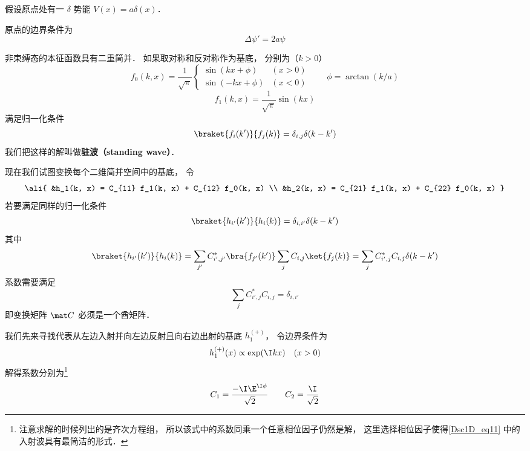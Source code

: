 
假设原点处有一 $\delta$ 势能 $V(x) = a\delta(x)$．

原点的边界条件为
\begin{equation}
\Delta \psi' = 2a \psi
\end{equation}

非束缚态的本征函数具有二重简并． 如果取对称和反对称作为基底， 分别为（$k > 0$）
\begin{equation}
f_0(k, x) = \frac{1}{\sqrt{\pi}}
\begin{cases}
\sin(kx + \phi) & (x > 0)\\
\sin(-kx + \phi) & (x < 0)
\end{cases}
\qquad  \phi = \arctan(k/a)
\end{equation}
\begin{equation}
f_1(k, x) = \frac{1}{\sqrt{\pi}}\sin(kx)
\end{equation}
满足归一化条件
\begin{equation}\label{Dsc1D_eq4}
\braket{f_i(k')}{f_j(k)} = \delta_{i,j} \delta(k - k')
\end{equation}
我们把这样的解叫做\textbf{驻波（standing wave）}．

现在我们试图变换每个二维简并空间中的基底， 令
\begin{equation}\ali{
&h_1(k, x) =  C_{11} f_1(k, x) + C_{12} f_0(k, x) \\
&h_2(k, x) =  C_{21} f_1(k, x) + C_{22} f_0(k, x)
}\end{equation}
若要满足同样的归一化条件
\begin{equation}\label{Dsc1D_eq6}
\braket{h_{i'}(k')}{h_i(k)} = \delta_{i,i'}\delta(k - k')
\end{equation}
其中
\begin{equation}
\braket{h_{i'}(k')}{h_i(k)} = \sum_{j'} C_{i',j'}^* \bra{f_{j'}(k')} \sum_j C_{i, j} \ket{f_j(k)} = \sum_j C_{i', j}^* C_{i, j} \delta(k - k')
\end{equation}
系数需要满足
\begin{equation}
 \sum_j C_{i', j}^* C_{i, j} = \delta_{i, i'}
\end{equation}
即变换矩阵 $\mat C$ 必须是一个酋矩阵．

我们先来寻找代表从左边入射并向左边反射且向右边出射的基底 $h_1^{(+)}$， 令边界条件为
\begin{equation}
h_1^{(+)}(x) \propto \exp(\I k x) \quad (x > 0)
\end{equation}
解得系数分别为\footnote{注意求解的时候列出的是齐次方程组， 所以该式中的系数同乘一个任意相位因子仍然是解， 这里选择相位因子使得\autoref{Dsc1D_eq11} 中的入射波具有最简洁的形式．}
\begin{equation}
C_1 = \frac{-\I\E^{\I \phi}}{\sqrt{2}} \qquad
C_2 =  \frac{\I}{\sqrt{2}}
\end{equation}

